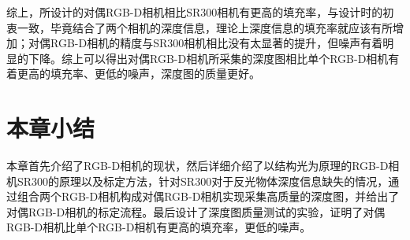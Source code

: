 综上，所设计的对偶RGB-D相机相比SR300相机有更高的填充率，与设计时的初衷一致，毕竟结合了两个相机的深度信息，理论上深度信息的填充率就应该有所增加；对偶RGB-D相机的精度与SR300相机相比没有太显著的提升，但噪声有着明显的下降。综上可以得出对偶RGB-D相机所采集的深度图相比单个RGB-D相机有着更高的填充率、更低的噪声，深度图的质量更好。

\section{本章小结}
本章首先介绍了RGB-D相机的现状，然后详细介绍了以结构光为原理的RGB-D相机SR300的原理以及标定方法，针对SR300对于反光物体深度信息缺失的情况，通过组合两个RGB-D相机构成对偶RGB-D相机实现采集高质量的深度图，并给出了对偶RGB-D相机的标定流程。最后设计了深度图质量测试的实验，证明了对偶RGB-D相机比单个RGB-D相机有更高的填充率，更低的噪声。

